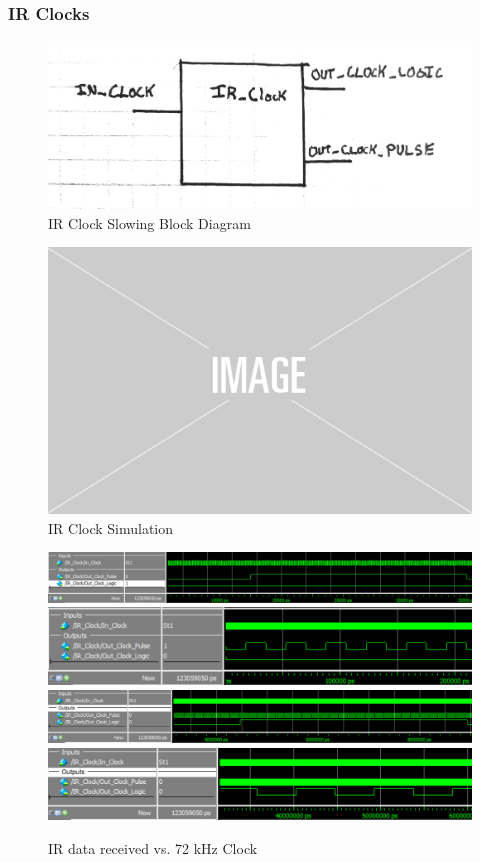 \documentclass[]{article}
\begin{document}
\subsubsection{IR Clocks}
\begin{figure}[H]\centering
    \includegraphics[width=0.9\linewidth]{figures/IR_Clock_Block.jpg}
    \caption{IR Clock Slowing Block Diagram}
    \label{fig:irClockBlock}
\end{figure}
\begin{figure}[H]\centering
    \includegraphics[width=0.5\linewidth]{figures/placeholder.png}
    \caption{IR Clock Simulation}
    \label{fig:irClockSim}
\end{figure}
\begin{figure}[H]\centering
    \includegraphics[width=\linewidth]{figures/IR_Clock_Sim1}
    \includegraphics[width=\linewidth]{figures/IR_Clock_Sim2}
    \includegraphics[width=\linewidth]{figures/IR_Clock_Sim3}
    \includegraphics[width=\linewidth]{figures/IR_Clock_Sim4}
    \caption{IR data received vs. 72 kHz Clock}
    \label{fig:asyncIRData}
\end{figure}
\end{document}
